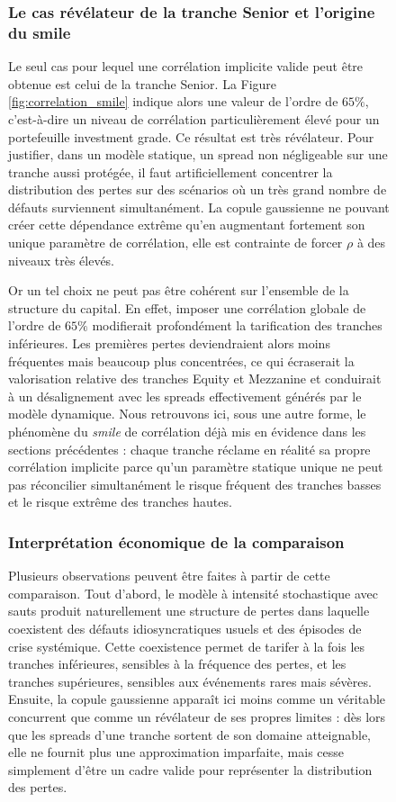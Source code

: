 \begin{figure}[H]
\subsubsection{Le cas révélateur de la tranche Senior et l'origine du smile}

Le seul cas pour lequel une corrélation implicite valide peut être obtenue est celui de la tranche Senior. La Figure \ref{fig:correlation_smile} indique alors une valeur de l'ordre de $65\%$, c'est-à-dire un niveau de corrélation particulièrement élevé pour un portefeuille investment grade. Ce résultat est très révélateur. Pour justifier, dans un modèle statique, un spread non négligeable sur une tranche aussi protégée, il faut artificiellement concentrer la distribution des pertes sur des scénarios où un très grand nombre de défauts surviennent simultanément. La copule gaussienne ne pouvant créer cette dépendance extrême qu'en augmentant fortement son unique paramètre de corrélation, elle est contrainte de forcer $\rho$ à des niveaux très élevés.

Or un tel choix ne peut pas être cohérent sur l'ensemble de la structure du capital. En effet, imposer une corrélation globale de l'ordre de $65\%$ modifierait profondément la tarification des tranches inférieures. Les premières pertes deviendraient alors moins fréquentes mais beaucoup plus concentrées, ce qui écraserait la valorisation relative des tranches Equity et Mezzanine et conduirait à un désalignement avec les spreads effectivement générés par le modèle dynamique. Nous retrouvons ici, sous une autre forme, le phénomène du \textit{smile} de corrélation déjà mis en évidence dans les sections précédentes : chaque tranche réclame en réalité sa propre corrélation implicite parce qu'un paramètre statique unique ne peut pas réconcilier simultanément le risque fréquent des tranches basses et le risque extrême des tranches hautes.

\subsubsection{Interprétation économique de la comparaison}

Plusieurs observations peuvent être faites à partir de cette comparaison. Tout d'abord, le modèle à intensité stochastique avec sauts produit naturellement une structure de pertes dans laquelle coexistent des défauts idiosyncratiques usuels et des épisodes de crise systémique. Cette coexistence permet de tarifer à la fois les tranches inférieures, sensibles à la fréquence des pertes, et les tranches supérieures, sensibles aux événements rares mais sévères. Ensuite, la copule gaussienne apparaît ici moins comme un véritable concurrent que comme un révélateur de ses propres limites : dès lors que les spreads d'une tranche sortent de son domaine atteignable, elle ne fournit plus une approximation imparfaite, mais cesse simplement d'être un cadre valide pour représenter la distribution des pertes.


\end{figure}
